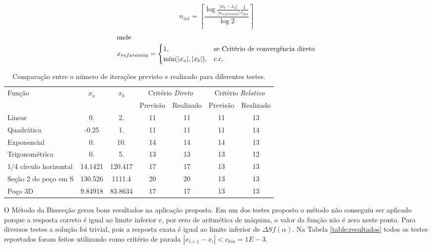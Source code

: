 \documentclass[final,3p,12pt]{elsarticle}
\begin{document}
    \begin{equation} \label{eq:nint}
        n_{int} = \left \lceil \frac{\log{\frac{|x_b-x_a|}{|x_{referencia}|}\frac{1}{c_{lim}}}}{\log{2}} \right \rceil
    \end{equation}
    \begin{align*}
        \intertext{onde}
        x_{referencia} = \begin{cases}
            1,&\text{se Critério de convergência direto} \\
            \min(|x_a|,|x_b|),&\text{c.c. }  
        \end{cases}
    \end{align*}

    \begin{table}[h] 
        \centering
        \caption{Comparação entre o número de iterações previsto e realizado para diferentes testes.}
        \begin{tabular}{ l c c c c c c }
            \multirow{2}{*}{Função} & \multirow{2}{*}{$x_a$} & \multirow{2}{*}{$x_b$} & \multicolumn{2}{c}{Critério \emph{Direto}} & \multicolumn{2}{c}{Critério \emph{Relativo}} \\
            &  &  & Previsão & Realizado & Previsão & Realizado \\
            \hline
            Linear & 0. & 2. & 11 & 11 & 11 & 13 \\
            Quadrática & -0.25 & 1. & 11 & 11 & 11 & 14 \\
            Exponencial & 0. & 10. & 14 & 14 & 14 & 13 \\
            Trigonométrica & 0. & 5. & 13 & 13 & 13 & 12 \\
            1/4 círculo horizontal & 14.1421 & 120.417 & 17 & 17 & 13 & 13 \\
            Seção 2 do poço em S & 130.526 & 1111.4 & 20 & 20 & 13 & 13 \\
            Poço 3D & 9.84918 & 83.8634 & 17 & 17 & 13 & 13 \\
        \end{tabular}
        \label{table:iteracoes}
    \end{table}
    
    O Método da Bissecção gerou bons resultados na aplicação proposta. Em um dos testes proposto o método não conseguiu ser aplicado porque a resposta correto é igual ao limite inferior e, por erro de aritmética de máquina, o valor da função não é zero neste ponto. Para diversos testes a solução foi trivial, pois a resposta exata é igual ao limite inferior de $\Delta S f(\alpha)$. Na Tabela \ref{table:resultados} todos os testes reportados foram feitos utilizando como critério de parada $|x_{i+1} - x_i| < c_{lim} = 1E-3$.
    
\end{document}

